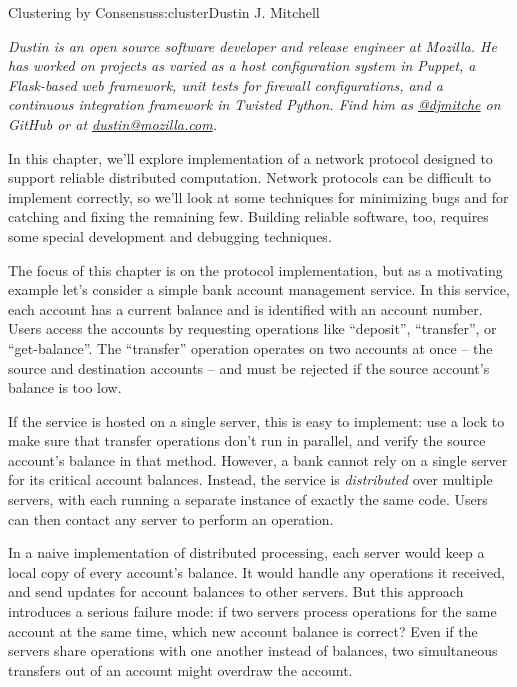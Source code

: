 \begin{aosachapter}{Clustering by Consensus}{s:cluster}{Dustin J. Mitchell}

\emph{Dustin is an open source software developer and release engineer
at Mozilla. He has worked on projects as varied as a host configuration
system in Puppet, a Flask-based web framework, unit tests for firewall
configurations, and a continuous integration framework in Twisted
Python. Find him as \href{http://github.com/djmitche}{@djmitche} on
GitHub or at \href{mailto:dustin@mozilla.com}{dustin@mozilla.com}.}

\label{introduction}

In this chapter, we'll explore implementation of a network protocol
designed to support reliable distributed computation. Network protocols
can be difficult to implement correctly, so we'll look at some
techniques for minimizing bugs and for catching and fixing the remaining
few. Building reliable software, too, requires some special development
and debugging techniques.

\label{motivating-example}

The focus of this chapter is on the protocol implementation, but as a
motivating example let's consider a simple bank account management
service. In this service, each account has a current balance and is
identified with an account number. Users access the accounts by
requesting operations like ``deposit'', ``transfer'', or
``get-balance''. The ``transfer'' operation operates on two accounts at
once -- the source and destination accounts -- and must be rejected if
the source account's balance is too low.

If the service is hosted on a single server, this is easy to implement:
use a lock to make sure that transfer operations don't run in parallel,
and verify the source account's balance in that method. However, a bank
cannot rely on a single server for its critical account balances.
Instead, the service is \emph{distributed} over multiple servers, with
each running a separate instance of exactly the same code. Users can
then contact any server to perform an operation.

In a naive implementation of distributed processing, each server would
keep a local copy of every account's balance. It would handle any
operations it received, and send updates for account balances to other
servers. But this approach introduces a serious failure mode: if two
servers process operations for the same account at the same time, which
new account balance is correct? Even if the servers share operations
with one another instead of balances, two simultaneous transfers out of
an account might overdraw the account.


\end{aosachapter}
